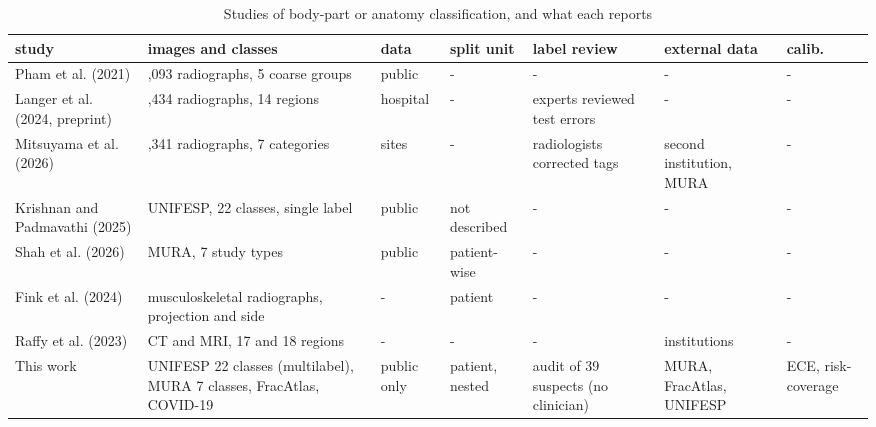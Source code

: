 \setcounter{table}{0}
\begin{table}[!ht]\centering
\caption{Studies of body-part or anatomy classification, and what each reports}\label{tab:literature}
{\footnotesize\setlength{\tabcolsep}{3pt}\begin{tabular}{@{}>{\raggedright\arraybackslash}p{}>{\raggedright\arraybackslash}p{}>{\raggedright\arraybackslash}p{}>{\raggedright\arraybackslash}p{}>{\raggedright\arraybackslash}p{}>{\raggedright\arraybackslash}p{}>{\raggedright\arraybackslash}p{}@{}}
\toprule
\textbf{study} & \textbf{images and classes} & \textbf{data} & \textbf{split unit} & \textbf{label review} & \textbf{external data} & \textbf{calib.} \\
\midrule
Pham et al. (2021) & 16,093 radiographs, 5 coarse groups & public & - & - & - & - \\
Langer et al. (2024, preprint) & 48,434 radiographs, 14 regions & hospital & - & experts reviewed test errors & - & - \\
Mitsuyama et al. (2026) & 429,341 radiographs, 7 categories & 2 sites & - & radiologists corrected tags & second institution, MURA & - \\
Krishnan and Padmavathi (2025) & UNIFESP, 22 classes, single label & public & not described & - & - & - \\
Shah et al. (2026) & MURA, 7 study types & public & patient-wise & - & - & - \\
Fink et al. (2024) & musculoskeletal radiographs, projection and side & - & patient & - & - & - \\
Raffy et al. (2023) & CT and MRI, 17 and 18 regions & - & - & - & 27 institutions & - \\
This work & UNIFESP 22 classes (multilabel), MURA 7 classes, FracAtlas, COVID-19 & public only & patient, nested & audit of 39 suspects (no clinician) & MURA, FracAtlas, UNIFESP & ECE, risk-coverage \\
\bottomrule
\end{tabular}}
\par{}
\end{table}
